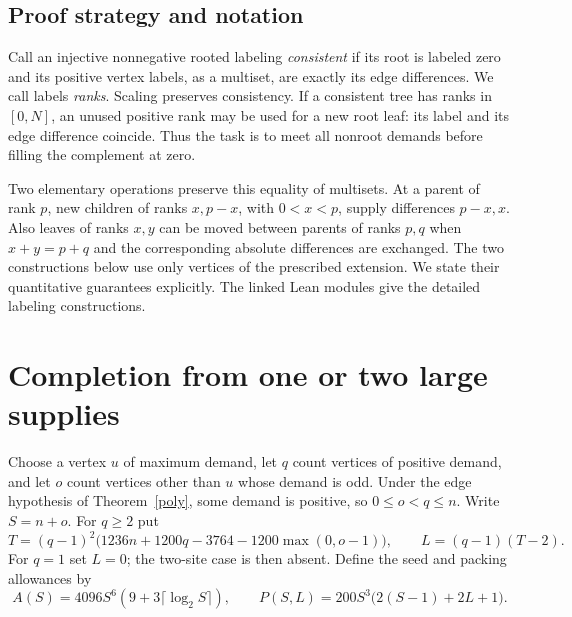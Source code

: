 \documentclass[11pt]{article}
\begin{document}
\subsection{Proof strategy and notation}
Call an injective nonnegative rooted labeling \emph{consistent} if its
root is labeled zero and its positive vertex labels, as a multiset,
are exactly its edge differences. We call labels \emph{ranks}. Scaling
preserves consistency. If a consistent tree has ranks in $[0,N]$, an
unused positive rank may be used for a new root leaf: its label and its
edge difference coincide. Thus the task is to meet all nonroot demands
before filling the complement at zero.

Two elementary operations preserve this equality of multisets. At a
parent of rank $p$, new children of ranks $x,p-x$, with $0<x<p$,
supply differences $p-x,x$. Also leaves of ranks $x,y$ can be moved
between parents of ranks $p,q$ when $x+y=p+q$ and the corresponding
absolute differences are exchanged. The two constructions below use only vertices of the prescribed extension.
We state their quantitative guarantees explicitly. The linked Lean modules
give the detailed labeling constructions.

\section{Completion from one or two large supplies}
Choose a vertex $u$ of maximum demand, let $q$ count vertices of positive
demand, and let $o$ count vertices other than $u$ whose demand is odd.
Under the edge hypothesis of Theorem~\ref{poly}, some demand is positive,
so $0\le o<q\le n$. Write $S=n+o$. For $q\ge2$ put
\[
 T=(q-1)^2\bigl(1236n+1200q-3764-1200\max(0,o-1)\bigr),
 \qquad L=(q-1)(T-2).
\]
For $q=1$ set $L=0$; the two-site case is then absent.
Define the seed and packing allowances by
\[
 A(S)=4096S^6(9+3\lceil\log_2 S\rceil),\qquad
 P(S,L)=200S^3\bigl(2(S-1)+2L+1\bigr).
\]
\end{document}
